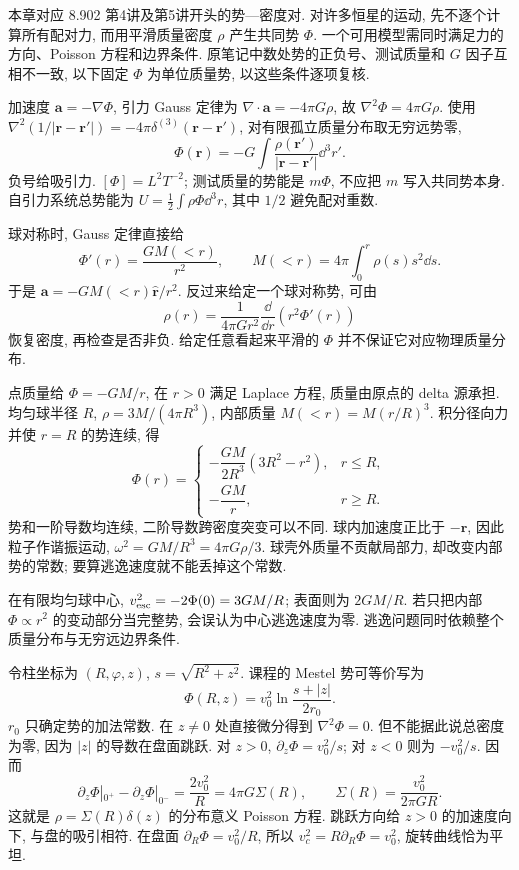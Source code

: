 
本章对应 8.902 第4讲及第5讲开头的势—密度对. 对许多恒星的运动, 先不逐个计算所有配对力, 而用平滑质量密度 $\rho$ 产生共同势 $\Phi$. 一个可用模型需同时满足力的方向、Poisson 方程和边界条件. 原笔记中数处势的正负号、测试质量和 $G$ 因子互相不一致, 以下固定 $\Phi$ 为单位质量势, 以这些条件逐项复核.

加速度 $\boldsymbol a=-\nabla\Phi$, 引力 Gauss 定律为 $\nabla\cdot\boldsymbol a=-4\pi G\rho$, 故 $\nabla^2\Phi=4\pi G\rho$. 使用 $\nabla^2(1/|\boldsymbol r-\boldsymbol r'|)=-4\pi\delta^{(3)}(\boldsymbol r-\boldsymbol r')$, 对有限孤立质量分布取无穷远势零,
\[
\Phi(\boldsymbol r)=-G\int\frac{\rho(\boldsymbol r')}{|\boldsymbol r-\boldsymbol r'|}\dd^3r'.
\]
负号给吸引力. $[\Phi]=L^2T^{-2}$; 测试质量的势能是 $m\Phi$, 不应把 $m$ 写入共同势本身. 自引力系统总势能为 $U=\frac12\int\rho\Phi\dd^3r$, 其中 $1/2$ 避免配对重数.

球对称时, Gauss 定律直接给
\[
\Phi'(r)=\frac{GM(<r)}{r^2},\qquad
M(<r)=4\pi\int_0^r\rho(s)s^2\dd s.
\]
于是 $\boldsymbol a=-GM(<r)\hat{\boldsymbol r}/r^2$. 反过来给定一个球对称势, 可由
\[
\rho(r)=\frac1{4\pi Gr^2}\frac{\dd}{\dd r}\left(r^2\Phi'(r)\right)
\]
恢复密度, 再检查是否非负. 给定任意看起来平滑的 $\Phi$ 并不保证它对应物理质量分布.

点质量给 $\Phi=-GM/r$, 在 $r>0$ 满足 Laplace 方程, 质量由原点的 delta 源承担. 均匀球半径 $R$, $\rho=3M/(4\pi R^3)$, 内部质量 $M(<r)=M(r/R)^3$. 积分径向力并使 $r=R$ 的势连续, 得
\[
\Phi(r)=\begin{cases}
-\dfrac{GM}{2R^3}(3R^2-r^2),&r\le R,\\[3pt]
-\dfrac{GM}{r},&r\ge R.
\end{cases}
\]
势和一阶导数均连续, 二阶导数跨密度突变可以不同. 球内加速度正比于 $-\boldsymbol r$, 因此粒子作谐振运动, $\omega^2=GM/R^3=4\pi G\rho/3$. 球壳外质量不贡献局部力, 却改变内部势的常数; 要算逃逸速度就不能丢掉这个常数.

\begin{example}
在有限均匀球中心, $v_{\rm esc}^2=-2\Phi(0)=3GM/R$; 表面则为 $2GM/R$. 若只把内部 $\Phi\propto r^2$ 的变动部分当完整势, 会误认为中心逃逸速度为零. 逃逸问题同时依赖整个质量分布与无穷远边界条件.
\end{example}

令柱坐标为 $(R,\varphi,z)$, $s=\sqrt{R^2+z^2}$. 课程的 Mestel 势可等价写为
\[
\Phi(R,z)=v_0^2\ln\frac{s+|z|}{2r_0}.
\]
$r_0$ 只确定势的加法常数. 在 $z\ne0$ 处直接微分得到 $\nabla^2\Phi=0$. 但不能据此说总密度为零, 因为 $|z|$ 的导数在盘面跳跃. 对 $z>0$, $\partial_z\Phi=v_0^2/s$; 对 $z<0$ 则为 $-v_0^2/s$. 因而
\[
\partial_z\Phi|_{0^+}-\partial_z\Phi|_{0^-}
=\frac{2v_0^2}{R}=4\pi G\Sigma(R),\qquad
\Sigma(R)=\frac{v_0^2}{2\pi GR}.
\]
这就是 $\rho=\Sigma(R)\delta(z)$ 的分布意义 Poisson 方程. 跳跃方向给 $z>0$ 的加速度向下, 与盘的吸引相符. 在盘面 $\partial_R\Phi=v_0^2/R$, 所以 $v_c^2=R\partial_R\Phi=v_0^2$, 旋转曲线恰为平坦.

